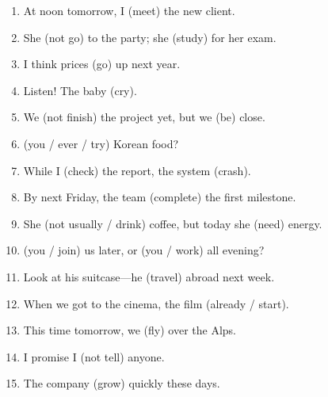 \documentclass[11pt,a4paper]{article}
\begin{document}
\begin{enumerate}
  \item At noon tomorrow, I \underline{\hspace{2.2cm}} (meet) the new client.
  \item She \underline{\hspace{2.2cm}} (not go) to the party; she \underline{\hspace{2.2cm}} (study) for her exam.
  \item I think prices \underline{\hspace{2.2cm}} (go) up next year.
  \item Listen! The baby \underline{\hspace{2.2cm}} (cry).
  \item We \underline{\hspace{2.2cm}} (not finish) the project yet, but we \underline{\hspace{2.2cm}} (be) close.
  \item \underline{\hspace{2.2cm}} (you / ever / try) Korean food?
  \item While I \underline{\hspace{2.2cm}} (check) the report, the system \underline{\hspace{2.2cm}} (crash).
  \item By next Friday, the team \underline{\hspace{2.2cm}} (complete) the first milestone.
  \item She \underline{\hspace{2.2cm}} (not usually / drink) coffee, but today she \underline{\hspace{2.2cm}} (need) energy.
  \item \underline{\hspace{2.2cm}} (you / join) us later, or \underline{\hspace{2.2cm}} (you / work) all evening?
  \item Look at his suitcase—he \underline{\hspace{2.2cm}} (travel) abroad next week.
  \item When we got to the cinema, the film \underline{\hspace{2.2cm}} (already / start).
  \item This time tomorrow, we \underline{\hspace{2.2cm}} (fly) over the Alps.
  \item I promise I \underline{\hspace{2.2cm}} (not tell) anyone.
  \item The company \underline{\hspace{2.2cm}} (grow) quickly these days.

\end{enumerate}
\end{document}
